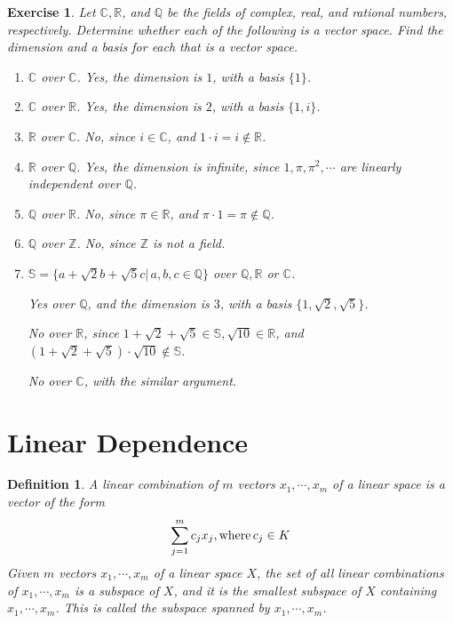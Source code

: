 \documentclass[11pt]{book}
\newtheorem{definition}{Definition}[section]
\newtheorem{exercise}{Exercise}[section]
\theoremstyle{definition}
\numberwithin{equation}{chapter}
\begin{document}
\medskip

\begin{exercise}\label{ex_6}{\rm \cite{1}}
Let $\mathbb{C},\mathbb{R}$, and $\mathbb{Q}$ be the fields of complex, real, and rational numbers, respectively. Determine whether each of the following is a vector space. Find the dimension and a basis for each that is a vector space.
\begin{enumerate}[label=(\alph*)]
    \item $\mathbb{C}$ over $\mathbb{C}$. Yes, the dimension is $1$, with a basis $\{1\}$.
    \item $\mathbb{C}$ over $\mathbb{R}$. Yes, the dimension is $2$, with a basis $\{1, i\}$.
    \item $\mathbb{R}$ over $\mathbb{C}$. No, since $i\in\mathbb{C}$, and $1\cdot i = i\notin\mathbb{R}$.
    \item $\mathbb{R}$ over $\mathbb{Q}$. Yes, the dimension is infinite, since $1,\pi,\pi^2,\cdots$ are linearly independent over $\mathbb{Q}$.
    \item $\mathbb{Q}$ over $\mathbb{R}$. No, since $\pi\in\mathbb{R}$, and $\pi\cdot 1 = \pi\notin\mathbb{Q}$.
    \item $\mathbb{Q}$ over $\mathbb{Z}$. No, since $\mathbb{Z}$ is not a field.
    \item $\mathbb{S} = \{a+\sqrt{2}b+\sqrt{5}c|\, a,b,c\in\mathbb{Q}\}$ over $\mathbb{Q},\mathbb{R}$ or $\mathbb{C}$. 
    
    Yes over $\mathbb{Q}$, and the dimension is $3$, with a basis $\{1,\sqrt{2},\sqrt{5}\}$. 
    
    No over $\mathbb{R}$, since $1+\sqrt{2}+\sqrt{5}\in\mathbb{S}, \sqrt{10}\in\mathbb{R}$, and $(1+\sqrt{2}+\sqrt{5})\cdot \sqrt{10}\notin\mathbb{S}$.
    
    No over $\mathbb{C}$, with the similar argument.
\end{enumerate}
\end{exercise}

\medskip

\section{Linear Dependence}

\begin{definition}
A linear combination of $m$ vectors $x_1,\cdots, x_m$ of a linear space is a vector of the form
\begin{align*}
    \sum^m_{j=1} c_j x_j, {\rm where}\, c_j \in K
\end{align*}
Given $m$ vectors $x_1,\cdots, x_m$ of a linear space $X$, the set of all linear combinations of $x_1,\cdots, x_m$ is a subspace of $X$, and it is the smallest subspace of $X$
containing $x_1,\cdots, x_m$. This is called the subspace spanned by $x_1,\cdots, x_m$.
\end{definition}
\end{document}
